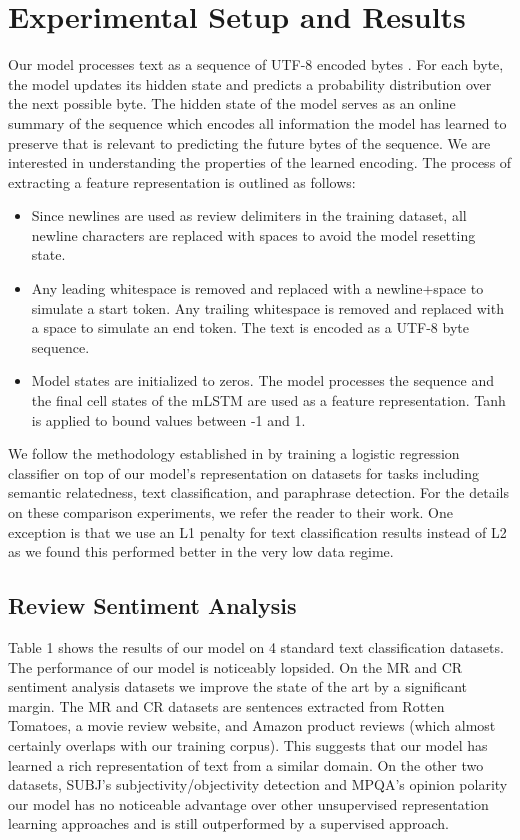 \section{Experimental Setup and Results}

Our model processes text as a sequence of UTF-8 encoded bytes \cite{yergeau2003utf}. For each byte, the model updates its hidden state and predicts a probability distribution over the next possible byte. The hidden state of the model serves as an online summary of the sequence which encodes all information the model has learned to preserve that is relevant to predicting the future bytes of the sequence. We are interested in understanding the properties of the learned encoding. The process of extracting a feature representation is outlined as follows:

\begin{itemize}
\item Since newlines are used as review delimiters in the training dataset, all newline characters are replaced with spaces to avoid the model resetting state.
\item Any leading whitespace is removed and replaced with a newline+space to simulate a start token. Any trailing whitespace is removed and replaced with a space to simulate an end token. The text is encoded as a UTF-8 byte sequence.
\item Model states are initialized to zeros. The model processes the sequence and the final cell states of the mLSTM are used as a feature representation. Tanh is applied to bound values between -1 and 1.
\end{itemize}

We follow the methodology established in \citet{kiros2015skip} by training a logistic regression classifier on top of our model's representation on datasets for tasks including semantic relatedness, text classification, and paraphrase detection. For the details on these comparison experiments, we refer the reader to their work. One exception is that we use an L1 penalty for text classification results instead of L2 as we found this performed better in the very low data regime.

\subsection{Review Sentiment Analysis}

Table 1 shows the results of our model on 4 standard text classification datasets. The performance of our model is noticeably lopsided. On the MR \cite{pang2005seeing} and CR \cite{hu2004mining} sentiment analysis datasets we improve the state of the art by a significant margin. The MR and CR datasets are sentences extracted from Rotten Tomatoes, a movie review website, and Amazon product reviews (which almost certainly overlaps with our training corpus). This suggests that our model has learned a rich representation of text from a similar domain. On the other two datasets, SUBJ's subjectivity/objectivity detection \cite{pang2004sentimental} and MPQA's opinion polarity \cite{wiebe2005annotating} our model has no noticeable advantage over other unsupervised representation learning approaches and is still outperformed by a supervised approach.

